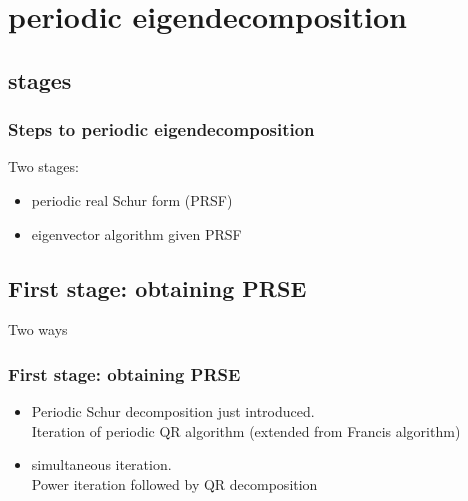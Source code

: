 \documentclass[mathserif, handout]{beamer}
\begin{document}
\ifpsd

\fi
\section{periodic eigendecomposition}

\subsection{stages}

\begin{frame}
  \frametitle{Steps to periodic eigendecomposition}
  Two stages:
  \begin{itemize}
  \item periodic real Schur form (PRSF)
  \item eigenvector algorithm given PRSF
  \end{itemize}

\end{frame}

\subsection{First stage: obtaining PRSE}
\begin{frame}
  Two ways 
  \frametitle{First stage: obtaining PRSE}
  \begin{itemize}
  \item {\color{cyan} Periodic Schur decomposition} just introduced. \\
    Iteration of periodic QR algorithm (extended from Francis algorithm)
    
    \pause

  \item {\color{cyan} simultaneous iteration}. \\
    Power iteration followed by QR decomposition 
  \end{itemize}
  
\end{frame}
\end{document}

